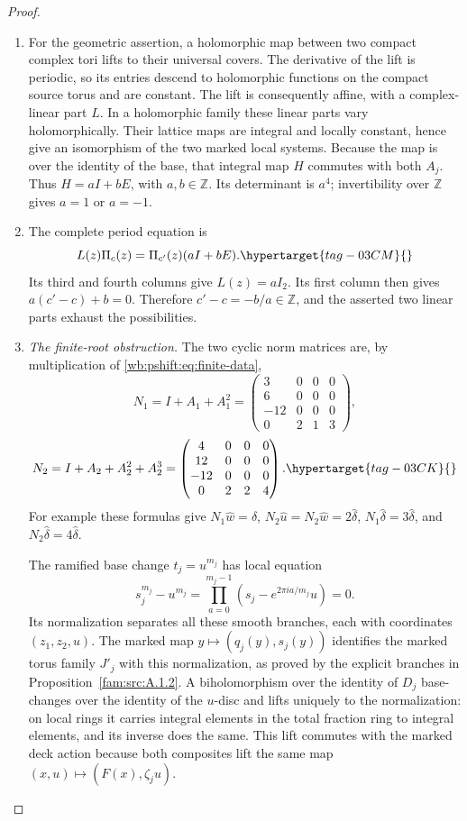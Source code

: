 \begin{proof}
\begin{enumerate}[label=\arabic*.,leftmargin=*]
\item For the geometric assertion, a holomorphic map between two compact
complex tori lifts to their universal covers. The derivative of the
lift is periodic, so its entries descend to holomorphic functions on
the compact source torus and are constant. The lift is consequently
affine, with a complex-linear part $L$. In a holomorphic family these
linear parts vary holomorphically. Their lattice maps are integral
and locally constant, hence give an isomorphism of the two marked
local systems. Because the map is over the identity of the base,
that integral map $H$ commutes with both $A_j$. Thus
$H=aI+bE$, with $a,b\in\mathbb Z$. Its determinant is $a^4$;
invertibility over $\mathbb Z$ gives $a=1$ or $a=-1$.

\item The complete period equation is
\begin{equation}
                   L(z)\Pi_c(z)=\Pi_{c'}(z)(aI+bE).
 \hypertarget{tag-03CM}{}\label{wb:pshift:eq:period-morphism}
\end{equation}
Its third and fourth columns give $L(z)=aI_2$. Its first column
then gives $a(c'-c)+b=0$. Therefore $c'-c=-b/a\in\mathbb Z$,
and the asserted two linear parts exhaust the possibilities.
\item \emph{The finite-root obstruction.}
The two cyclic norm matrices are, by multiplication of \eqref{wb:pshift:eq:finite-data},
\[
 N_1=I+A_1+A_1^2=
 \begin{pmatrix}3&0&0&0\\6&0&0&0\\-12&0&0&0\\0&2&1&3\end{pmatrix},
\]
\begin{equation}
 N_2=I+A_2+A_2^2+A_2^3=
 \begin{pmatrix}4&0&0&0\\12&0&0&0\\-12&0&0&0\\0&2&2&4\end{pmatrix}.
 \hypertarget{tag-03CK}{}\label{wb:pshift:eq:norms}
\end{equation}
For example these formulas give
$N_1\widehat w=\widehat\delta$,
$N_2\widehat u=N_2\widehat w=2\widehat\delta$,
$N_1\widehat\delta=3\widehat\delta$, and
$N_2\widehat\delta=4\widehat\delta$.

The ramified base change
$t_j=u^{m_j}$ has local equation
\[
 s_j^{m_j}-u^{m_j}
   =\prod_{a=0}^{m_j-1}(s_j-e^{2\pi ia/m_j}u)=0.
\]
Its normalization separates all these smooth branches, each with
coordinates $(z_1,z_2,u)$. The marked map
$y\mapsto(q_j(y),s_j(y))$ identifies the marked torus family $J'_j$
with this normalization, as proved by the explicit branches in
Proposition~\ref{fam:src:A.1.2}. A biholomorphism over the identity of
$D_j$ base-changes over the identity of the $u$-disc and lifts uniquely
to the normalization: on local rings it carries integral elements in
the total fraction ring to integral elements, and its inverse does
the same. This lift commutes with the marked deck action because
both composites lift the same map $(x,u)\mapsto(F(x),\zeta_j u)$.


\end{enumerate}
\end{proof}
